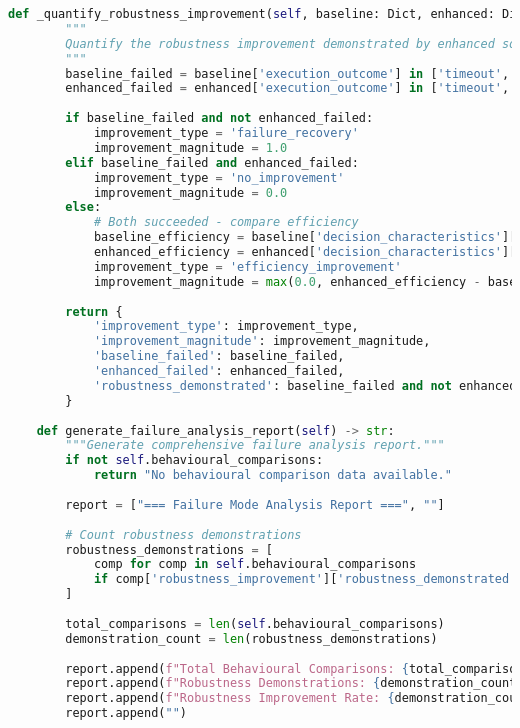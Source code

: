 \begin{lstlisting}[language=Python, caption=Systematic Failure Mode Documentation and Recovery Analysis]
    def _quantify_robustness_improvement(self, baseline: Dict, enhanced: Dict) -> Dict:
        """
        Quantify the robustness improvement demonstrated by enhanced solver.
        """
        baseline_failed = baseline['execution_outcome'] in ['timeout', 'unsolved']
        enhanced_failed = enhanced['execution_outcome'] in ['timeout', 'unsolved']
        
        if baseline_failed and not enhanced_failed:
            improvement_type = 'failure_recovery'
            improvement_magnitude = 1.0
        elif baseline_failed and enhanced_failed:
            improvement_type = 'no_improvement'
            improvement_magnitude = 0.0
        else:
            # Both succeeded - compare efficiency
            baseline_efficiency = baseline['decision_characteristics']['decision_efficiency']
            enhanced_efficiency = enhanced['decision_characteristics']['decision_efficiency']
            improvement_type = 'efficiency_improvement'
            improvement_magnitude = max(0.0, enhanced_efficiency - baseline_efficiency)
        
        return {
            'improvement_type': improvement_type,
            'improvement_magnitude': improvement_magnitude,
            'baseline_failed': baseline_failed,
            'enhanced_failed': enhanced_failed,
            'robustness_demonstrated': baseline_failed and not enhanced_failed
        }
    
    def generate_failure_analysis_report(self) -> str:
        """Generate comprehensive failure analysis report."""
        if not self.behavioural_comparisons:
            return "No behavioural comparison data available."
        
        report = ["=== Failure Mode Analysis Report ===", ""]
        
        # Count robustness demonstrations
        robustness_demonstrations = [
            comp for comp in self.behavioural_comparisons 
            if comp['robustness_improvement']['robustness_demonstrated']
        ]
        
        total_comparisons = len(self.behavioural_comparisons)
        demonstration_count = len(robustness_demonstrations)
        
        report.append(f"Total Behavioural Comparisons: {total_comparisons}")
        report.append(f"Robustness Demonstrations: {demonstration_count}")
        report.append(f"Robustness Improvement Rate: {demonstration_count/total_comparisons:.2%}")
        report.append("")
        

\end{lstlisting}
